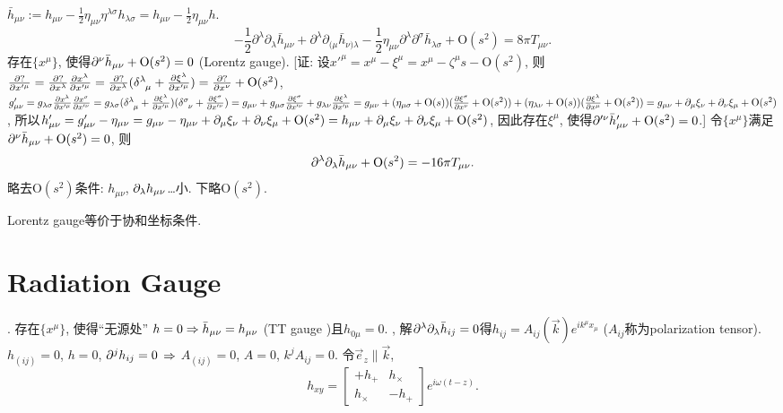 $\bar{h}_{\mu\nu}:=h_{\mu\nu}-\frac{1}{2}\eta_{\mu\nu}\eta^{\lambda\sigma}h_{\lambda\sigma}=h_{\mu\nu}-\frac{1}{2}\eta_{\mu\nu}h$.
\begin{equation}
    -\frac{1}{2} \partial^{\lambda} \partial_{\lambda} \bar{h}_{\mu \nu}+\partial^{\lambda} \partial_{(\mu} \bar{h}_{\nu) \lambda}-\frac{1}{2} \eta_{\mu \nu} \partial^{\lambda} \partial^{\sigma} \bar{h}_{\lambda \sigma}+\text{O}(s^2)=8 \pi T_{\mu \nu}.
\end{equation}
存在$\{x^{\mu}\}$, 使得$\partial^{\nu}\bar{h}_{\mu\nu}+\text{O}(s^2)=0$ (Lorentz gauge). [证: 设$x'^\mu=x^\mu-\xi^\mu=x^\mu-\zeta^\mu s-\text{O}(s^2)$, 则$\frac{\p ?}{\p x'^\mu}=\frac{\p ?}{\p x^\lambda}\frac{\p x^\lambda}{\p x'^\mu}=\frac{\p ?}{\p x^\lambda}(\delta^{\lambda}_{\ph{\lambda}\mu}+\frac{\p \xi^\lambda}{\p x'^\mu})=\frac{\p ?}{\p x^\nu}+\text{O}(s^2)$, $g'_{\mu\nu}=g_{\lambda\sigma}\frac{\p x^\lambda}{\p x'^\mu}\frac{\p x^\sigma}{\p x'^\nu}=g_{\lambda\sigma}(\delta^{\lambda}_{\ph{\lambda}\mu}+\frac{\p \xi^\lambda}{\p x'^\mu})(\delta^{\sigma}_{\ph{\sigma}\nu}+\frac{\p \xi^\sigma}{\p x'^\nu})=g_{\mu\nu}+g_{\mu\sigma}\frac{\p \xi^\sigma}{\p x'^\nu}+g_{\lambda\nu}\frac{\p \xi^\lambda}{\p x'^\mu}=g_{\mu\nu}+(\eta_{\mu\sigma}+\text{O}(s))(\frac{\p \xi^\sigma}{\p x^\nu}+\text{O}(s^2))+(\eta_{\lambda\nu}+\text{O}(s))(\frac{\p \xi^\lambda}{\p x^\mu}+\text{O}(s^2))=g_{\mu\nu}+\p_\mu\xi_\nu+\p_\nu\xi_\mu+\text{O}(s^2)$, 所以$h'_{\mu\nu}=g'_{\mu\nu}-\eta_{\mu\nu}=g_{\mu\nu}-\eta_{\mu\nu}+\partial_\mu\xi_\nu+\partial_\nu\xi_\mu+\text{O}(s^2)=h_{\mu\nu}+\partial_\mu\xi_\nu+\partial_\nu\xi_\mu+\text{O}(s^2)$, 因此存在$\xi^\mu$, 使得$\partial'^{\nu}\bar{h}'_{\mu\nu}+\text{O}(s^2)=0$.] 令$\{x^{\mu}\}$满足$\partial^{\nu}\bar{h}_{\mu\nu}+\text{O}(s^2)=0$, 则
\begin{equation}
    \partial^{\lambda}\partial_{\lambda}\bar{h}_{\mu\nu}+\text{O}(s^2)=-16\pi T_{\mu \nu}.\label{lin_gravity}
\end{equation}
略去$\text{O}(s^2)$条件: $h_{\mu\nu}$, $\partial_\lambda h_{\mu\nu}$\dots{}小. 下略$\text{O}(s^2)$.

Lorentz gauge等价于协和坐标条件.

\section{Radiation Gauge}

\cite{Wald1984}. 存在$\{x^{\mu}\}$, 使得``无源处'' $h=0\Rightarrow\bar{h}_{\mu\nu}=h_{\mu\nu}$ (TT gauge \cite{王2020})且$h_{0\mu}=0$. \cite{Maggiore2014}, 解$\partial^{\lambda}\partial_{\lambda}\bar{h}_{ij}=0$得$h_{ij}=A_{ij}(\vec{k})e^{ik^\mu x_\mu}$ ($A_{ij}$称为polarization tensor). $h_{(ij)}=0$, $h=0$, $\partial^{j}h_{ij}=0$ $\Rightarrow$ $A_{(ij)}=0$, $A=0$, $k^{j}A_{ij}=0$. 令$\vec{e}_z\parallel\vec{k}$,
\begin{equation}
    h_{xy}=\begin{bmatrix}
        +h_+&h_\times\\
        h_\times&-h_+
    \end{bmatrix}e^{i\omega(t-z)}.\label{h_xy}
\end{equation}

